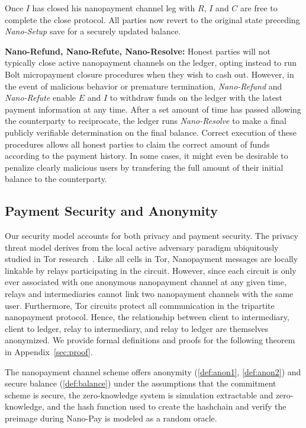 Once $I$ has closed his nanopayment channel leg with $R$, $I$ and $C$ are free to complete the close protocol.
All parties now revert to the original state preceding \emph{Nano-Setup} save for a securely updated balance.

\medskip \noindent\textbf{Nano-Refund, Nano-Refute, Nano-Resolve:} Honest parties will not typically close active nanopayment channels on the ledger, opting instead to run Bolt micropayment closure procedures when they wish to cash out.
However, in the event of malicious behavior or premature termination, \emph{Nano-Refund} and \emph{Nano-Refute} enable $E$ and $I$ to withdraw funds on the ledger with the latest payment information at any time.
After a set amount of time has passed allowing the counterparty to reciprocate, the ledger runs \emph{Nano-Resolve} to make a final publicly verifiable determination on the final balance.
Correct execution of these procedures allows all honest parties to claim the correct amount of funds according to the payment history.
In some cases, it might even be desirable to penalize clearly malicious users by transfering the full amount of their initial balance to the counterparty.

\subsection{Payment Security and Anonymity} \label{subsec:paysecurity} Our security model accounts for both privacy and payment security.
The privacy threat model derives from the local active adversary paradigm ubiquitously studied in Tor research~\cite{dingledine2004tor}.
Like all cells in Tor, Nanopayment messages are locally linkable by relays participating in the circuit.
However, since each circuit is only ever associated with one anonymous nanopayment channel at any given time, relays and intermediaries cannot link two nanopayment channels with the same user.
Furthermore, Tor circuits protect all communication in the tripartite nanopayment protocol.
Hence, the relationship between client to intermediary, client to ledger, relay to intermediary, and relay to ledger are themselves anonymized.
We provide formal definitions and proofs for the following theorem in Appendix~\ref{sec:proof}.

\begin{theorem}

  The nanopayment channel scheme offers anonymity (\ref{def:anon1}, \ref{def:anon2}) and secure balance (\ref{def:balance}) under the assumptions that the commitment scheme is secure, the zero-knowledge system is simulation extractable and zero-knowledge, and the hash function used to create the hashchain and verify the preimage during Nano-Pay is modeled as a random oracle.

\end{theorem}

